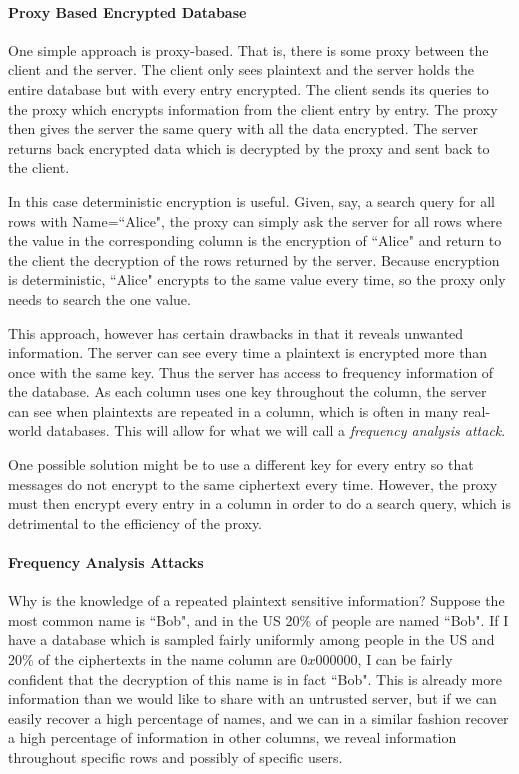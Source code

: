 \paragraph{Proxy Based Encrypted Database} One simple approach is proxy-based. That is, there is some proxy between the client and the server. The client only sees plaintext and the server holds the entire database but with every entry encrypted. The client sends its queries to the proxy which encrypts information from the client entry by entry. The proxy then gives the server the same query with all the data encrypted. The server returns back encrypted data which is decrypted by the proxy and sent back to the client. 

In this case deterministic encryption is useful. Given, say, a search query for all rows with Name=``Alice", the proxy can simply ask the server for all rows where the value in the corresponding column is the encryption of ``Alice" and return to the client the decryption of the rows returned by the server. Because encryption is deterministic, ``Alice" encrypts to the same value every time, so the proxy only needs to search the one value.

This approach, however has certain drawbacks in that it reveals unwanted information. The server can see every time a plaintext is encrypted more than once with the same key.
Thus the server has access to frequency information of the database. As each column uses one key throughout the column, the server can see when plaintexts are repeated in a column, which is often in many real-world databases. This will allow for what we will call a \textit{frequency analysis attack}.
    
One possible solution might be to use a different key for every entry so that messages do not encrypt to the same ciphertext every time. However, the proxy must then encrypt every entry in a column in order to do a search query, which  is detrimental to the efficiency of the proxy.


\paragraph{Frequency Analysis Attacks}
    Why is the knowledge of a repeated plaintext sensitive information? Suppose the most common name is ``Bob", and in the US 20\% of people are named ``Bob". If I have a database which is sampled fairly uniformly among people in the US and 20\% of the ciphertexts in the name column are $0x000000$, I can be fairly confident that the decryption of this name is in fact ``Bob". This is already more information than we would like to share with an untrusted server, but if we can easily recover a high percentage of names, and we can in a similar fashion recover a high percentage of information in other columns, we reveal information throughout specific rows and possibly of specific users.
    
